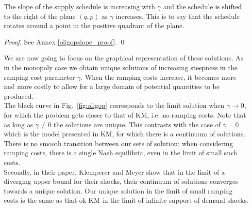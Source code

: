\begin{proposition}\label{oligoslope_prop}
The slope of the supply schedule is increasing with $\gamma$ and the schedule is shifted to the right of the plane $(q,p)$ as $\gamma$ increases. This is to say that the schedule rotates around a point in the positive quadrant of the plane. 
\end{proposition}
\begin{proof}
See Annex \ref{oligopslope_proof}. \qed
\end{proof}

We are now going to focus on the graphical representation of these solutions. As in the monopoly case we obtain unique solutions of increasing steepness in the ramping cost parameter $\gamma$. When the ramping costs increase, it becomes more and more costly to allow for a large domain of potential quantities to be produced. \\

The black curve in Fig.~\ref{fig:oligop} corresponds to the limit solution when $\gamma\to0$, for which the problem gets closer to that of KM, i.e. no ramping costs. Note that as long as $\gamma\neq0$ the solutions are unique. This contrasts with the case of $\gamma=0$ which is the model presented in KM, for which there is a continuum of solutions. There is no smooth transition between our sets of solution: when considering ramping costs, there is a single Nash equilibria, even in the limit of small such costs.\\

Secondly, in their paper, Klemperer and Meyer show that in the limit of a diverging upper bound for their shocks, their continuum of solutions converges towards a unique solution. Our unique solution in the limit of small ramping costs is the same as that ok KM in the limit of infinite support of demand shocks.\\

